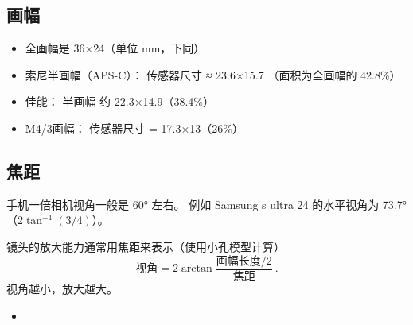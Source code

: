
\subsection{画幅}
\begin{itemize}
\item 全画幅是 36×24（单位 mm，下同）
\item 索尼半画幅（APS-C）： 传感器尺寸 ≈ 23.6×15.7 （面积为全画幅的 42.8\%）
\item 佳能： 半画幅 约 22.3×14.9（38.4\%）
\item M4/3画幅： 传感器尺寸 = 17.3×13（26\%）
\end{itemize}

\subsection{焦距}
手机一倍相机视角一般是 60° 左右。 例如 Samsung s ultra 24 的水平视角为 73.7°（$2\tan^{-1}(3/4)$）。

镜头的放大能力通常用焦距来表示（使用小孔模型计算）
\begin{equation}
\text{视角} = 2\arctan{\frac{\text{画幅长度/2}}{\text{焦距}}}~.
\end{equation}
视角越小，放大越大。 
\begin{itemize}
\item 
\end{itemize}
